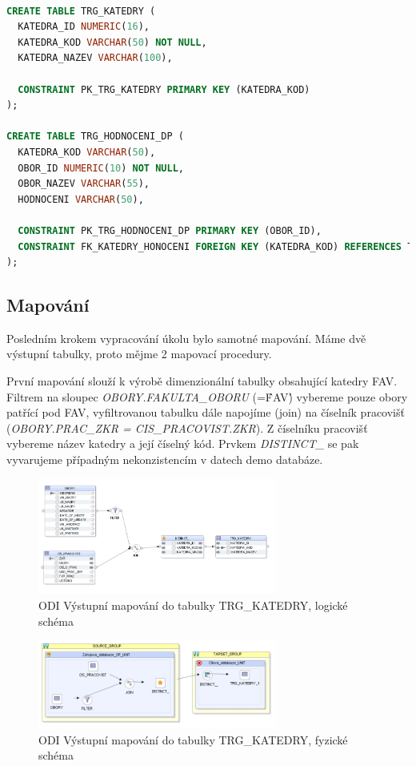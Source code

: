 \begin{lstlisting}[language=sql]

CREATE TABLE TRG_KATEDRY (
  KATEDRA_ID NUMERIC(16),
  KATEDRA_KOD VARCHAR(50) NOT NULL,
  KATEDRA_NAZEV VARCHAR(100),

  CONSTRAINT PK_TRG_KATEDRY PRIMARY KEY (KATEDRA_KOD)
);

CREATE TABLE TRG_HODNOCENI_DP (
  KATEDRA_KOD VARCHAR(50),
  OBOR_ID NUMERIC(10) NOT NULL,
  OBOR_NAZEV VARCHAR(55),
  HODNOCENI VARCHAR(50),

  CONSTRAINT PK_TRG_HODNOCENI_DP PRIMARY KEY (OBOR_ID),
  CONSTRAINT FK_KATEDRY_HONOCENI FOREIGN KEY (KATEDRA_KOD) REFERENCES TRG_KATEDRY (KATEDRA_KOD)
);
\end{lstlisting}

\subsection{Mapování}

Posledním krokem vypracování úkolu bylo samotné mapování.
Máme dvě výstupní tabulky, proto mějme 2 mapovací procedury.

První mapování slouží k výrobě dimenzionální tabulky obsahující katedry FAV.
Filtrem na sloupec \textit{OBORY.FAKULTA\_OBORU} (=\'FAV\') vybereme pouze obory patřící pod FAV, vyfiltrovanou tabulku dále napojíme (join) na číselník pracovišť (\textit{OBORY.PRAC\_ZKR = CIS\_PRACOVIST.ZKR}).
Z číselníku pracovišť vybereme název katedry a její číselný kód.
Prvkem \textit{DISTINCT\_} se pak vyvarujeme případným nekonzistencím v datech demo databáze.

\begin{figure}[htb]
    \centering
    \includegraphics[width=0.7\textwidth]{graphs/odi-mapping-trg-katedry.png}
    \caption{ODI Výstupní mapování do tabulky TRG\_KATEDRY, logické schéma}
    \label{fig:odi-mapping-trg-katedry}
\end{figure}
\FloatBarrier

\begin{figure}[htb]
    \centering
    \includegraphics[width=0.7\textwidth]{graphs/odi-mapping-trg-katedry-physical.png}
    \caption{ODI Výstupní mapování do tabulky TRG\_KATEDRY, fyzické schéma}
    \label{fig:odi-mapping-trg-katedry-physical}
\end{figure}
\FloatBarrier

